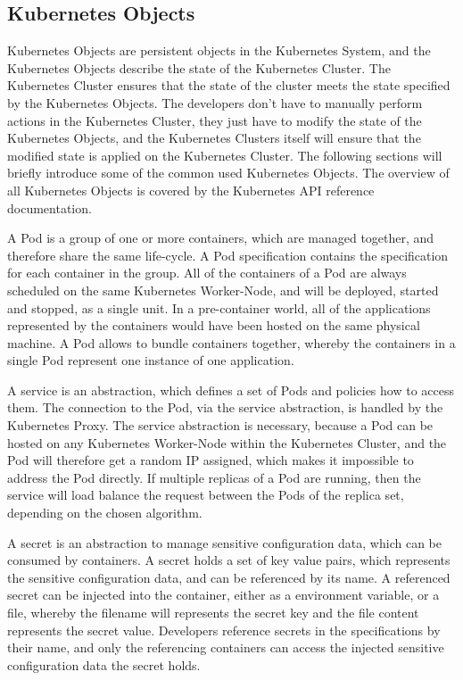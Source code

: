 \subsection{Kubernetes Objects}
\label{sec:caas-kubernetes-objects}
Kubernetes Objects are persistent objects in the Kubernetes System, and the Kubernetes Objects describe the state of the Kubernetes Cluster. The Kubernetes Cluster ensures that the state of the cluster meets the state specified by the Kubernetes Objects. The developers don't have to manually perform actions in the Kubernetes Cluster, they just have to modify the state of the Kubernetes Objects, and the Kubernetes Clusters itself will ensure that the modified state is applied on the Kubernetes Cluster. The following sections will briefly introduce some of the common used Kubernetes Objects. The overview of all Kubernetes Objects is covered by the Kubernetes API reference documentation\cite{CNCFKubernetesAPI2018}. 

A Pod is a group of one or more containers, which are managed together, and therefore share the same life-cycle. A Pod specification contains the specification for each container in the group. All of the containers of a Pod are always scheduled on the same Kubernetes Worker-Node, and will be deployed, started and stopped, as a single unit. In a pre-container world, all of the applications represented by the containers would have been hosted on the same physical machine. A Pod allows to bundle containers together, whereby the containers in a single Pod represent one instance of one application\cite{CNCFKubernetesPods2018}. 

A service is an abstraction, which defines a set of Pods and policies how to access them. The connection to the Pod, via the service abstraction, is handled by the Kubernetes Proxy. The service abstraction is necessary, because a Pod can be hosted on any Kubernetes Worker-Node within the Kubernetes Cluster, and the Pod will therefore get a random IP assigned, which makes it impossible to address the Pod directly. If multiple replicas of a Pod are running, then the service will load balance the request between the Pods of the replica set, depending on the chosen algorithm\cite{CNCFKubernetesServices2018}.

A secret is an abstraction to manage sensitive configuration data, which can be consumed by containers. A secret holds a set of key value pairs, which represents the sensitive configuration data, and can be referenced by its name. A referenced secret can be injected into the container, either as a environment variable, or a file, whereby the filename will represents the secret key and the file content represents the secret value. Developers reference secrets in the specifications by their name, and only the referencing containers can access the injected sensitive configuration data the secret holds\cite{CNCFKubernetesSecrets2018}. 

